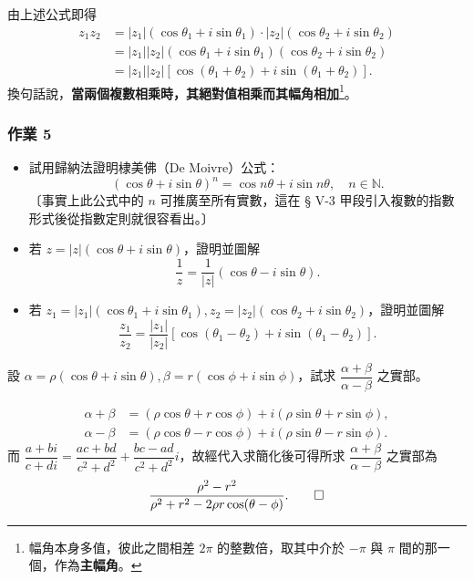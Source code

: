 由上述公式即得
\begin{align*}
z_1 z_2 &= |z_1|(\cos\theta_1+i\sin\theta_1)\cdot |z_2|(\cos\theta_2+i\sin\theta_2) \\
&= |z_1||z_2|(\cos\theta_1+i\sin\theta_1)(\cos\theta_2+i\sin\theta_2) \\
&= |z_1||z_2|[\cos(\theta_1+\theta_2)+i\sin(\theta_1+\theta_2)].
\end{align*}
換句話說，\textbf{當兩個複數相乘時，其絕對值相乘而其幅角相加}\footnote{幅角本身多值，彼此之間相差 $2\pi$ 的整數倍，取其中介於 $-\pi$ 與 $\pi$ 間的那一個，作為\textbf{主幅角}。}。

\subsubsection*{作業 5}
\begin{itemize}
  \item[(i)] 試用歸納法證明棣美佛（De Moivre）公式：
  \[
  (\cos\theta+i\sin\theta)^n = \cos n\theta+i\sin n\theta, \quad n \in \mathbb{N}.
  \]
  〔事實上此公式中的 $n$ 可推廣至所有實數，這在 § V-3 甲段引入複數的指數形式後從指數定則就很容看出。〕
  \item[(ii)] 若 $z=|z|(\cos\theta+i\sin\theta)$，證明並圖解
  \[
  \frac{1}{z} = \frac{1}{|z|}(\cos\theta-i\sin\theta).
  \]
  \item[(iii)] 若 $z_1=|z_1|(\cos\theta_1+i\sin\theta_1), z_2=|z_2|(\cos\theta_2+i\sin\theta_2)$，證明並圖解
  \[
  \frac{z_1}{z_2} = \frac{|z_1|}{|z_2|}[\cos(\theta_1-\theta_2)+i\sin(\theta_1-\theta_2)].
  \]
\end{itemize}


\begin{example}
設 $\alpha = \rho(\cos\theta+i\sin\theta), \beta = r(\cos\phi+i\sin\phi)$，試求 $\dfrac{\alpha+\beta}{\alpha-\beta}$ 之實部。
\end{example}

\begin{solution}
\begin{align*}
\alpha+\beta &= (\rho\cos\theta+r\cos\phi)+i(\rho\sin\theta+r\sin\phi), \\
\alpha-\beta &= (\rho\cos\theta-r\cos\phi)+i(\rho\sin\theta-r\sin\phi).
\end{align*}
而 $\dfrac{a+bi}{c+di} = \dfrac{ac+bd}{c^2+d^2} + \dfrac{bc-ad}{c^2+d^2}i$，故經代入求簡化後可得所求 $\dfrac{\alpha+\beta}{\alpha-\beta}$ 之實部為
\[
\frac{\rho^2-r^2}{\rho^2+r^2-2\rho r\cos(\theta-\phi)}. \qedhere
\]
\end{solution}


